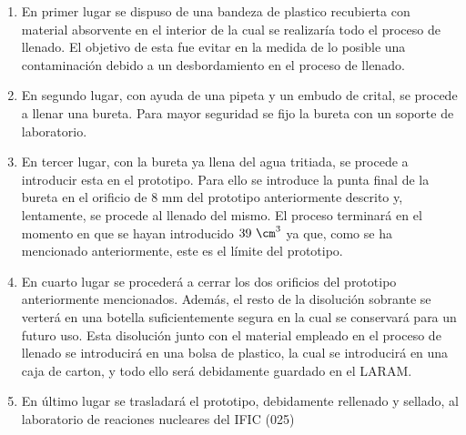 \begin{enumerate}
\item{} En primer lugar se dispuso de una bandeza de plastico recubierta con material absorvente en el interior de la cual se realizaría todo el proceso de llenado. El objetivo de esta fue evitar en la medida de lo posible una contaminación debido a un desbordamiento en el proceso de llenado. 

\item{} En segundo lugar, con ayuda de una pipeta y un embudo de crital, se procede a llenar una bureta. Para mayor seguridad se fijo la bureta con un soporte de laboratorio. 

\item{} En tercer lugar, con la bureta ya llena del agua tritiada, se procede a introducir esta en el prototipo. Para ello se introduce la punta final de la bureta en el orificio de 8 mm del prototipo anteriormente descrito y, lentamente, se procede al llenado del mismo. El proceso terminará en el momento en que se hayan introducido $39~\cm^3$ ya que, como se ha mencionado anteriormente, este es el límite del prototipo.

\item{} En cuarto lugar se procederá a cerrar los dos orificios del prototipo anteriormente mencionados. Además, el resto de la disolución sobrante se verterá en una botella suficientemente segura en la cual se conservará para un futuro uso. Esta disolución junto con el material empleado en el proceso de llenado se introducirá en una bolsa de plastico, la cual se introducirá en una caja de carton, y todo ello será debidamente guardado en el LARAM.

\item{} En último lugar se trasladará el prototipo, debidamente rellenado y sellado, al laboratorio de reaciones nucleares del IFIC (025)

\end{enumerate}

